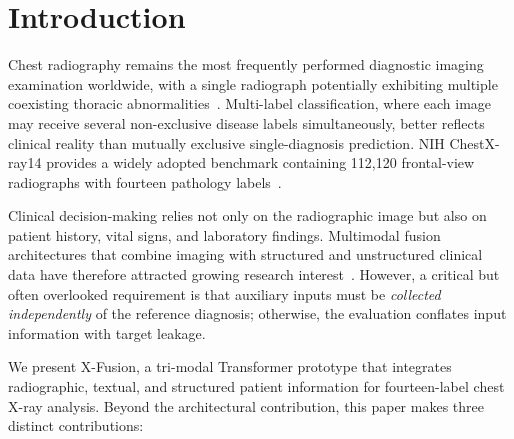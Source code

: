 \documentclass[runningheads,a4paper]{llncs}
\begin{document}
\section{Introduction}

Chest radiography remains the most frequently performed diagnostic imaging examination worldwide, with a single radiograph potentially exhibiting multiple coexisting thoracic abnormalities~\cite{wang2017}.
Multi-label classification, where each image may receive several non-exclusive disease labels simultaneously, better reflects clinical reality than mutually exclusive single-diagnosis prediction.
NIH ChestX-ray14 provides a widely adopted benchmark containing 112{,}120 frontal-view radiographs with fourteen pathology labels~\cite{wang2017,nihdataset}.

Clinical decision-making relies not only on the radiographic image but also on patient history, vital signs, and laboratory findings.
Multimodal fusion architectures that combine imaging with structured and unstructured clinical data have therefore attracted growing research interest~\cite{biomedclip2023,cxrbert2022}.
However, a critical but often overlooked requirement is that auxiliary inputs must be \emph{collected independently} of the reference diagnosis; otherwise, the evaluation conflates input information with target leakage.

We present X-Fusion, a tri-modal Transformer prototype that integrates radiographic, textual, and structured patient information for fourteen-label chest X-ray analysis.
Beyond the architectural contribution, this paper makes three distinct contributions:
\end{document}
